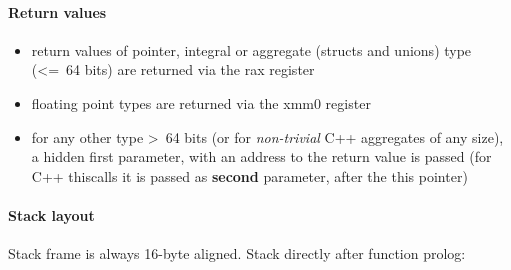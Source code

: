 \paragraph{Return values}

\begin{itemize}
\item return values of pointer, integral or aggregate (structs and unions) type (\textless=\ 64 bits) are returned via the rax register
\item floating point types are returned via the xmm0 register
\item for any other type \textgreater\ 64 bits (or for {\it non-trivial} C++ aggregates of any size), a hidden first parameter, with an address to the
return value is passed (for C++ thiscalls it is passed as {\bf second} parameter, after the this pointer)
\end{itemize}


\paragraph{Stack layout}

Stack frame is always 16-byte aligned.
Stack directly after function prolog:\\

